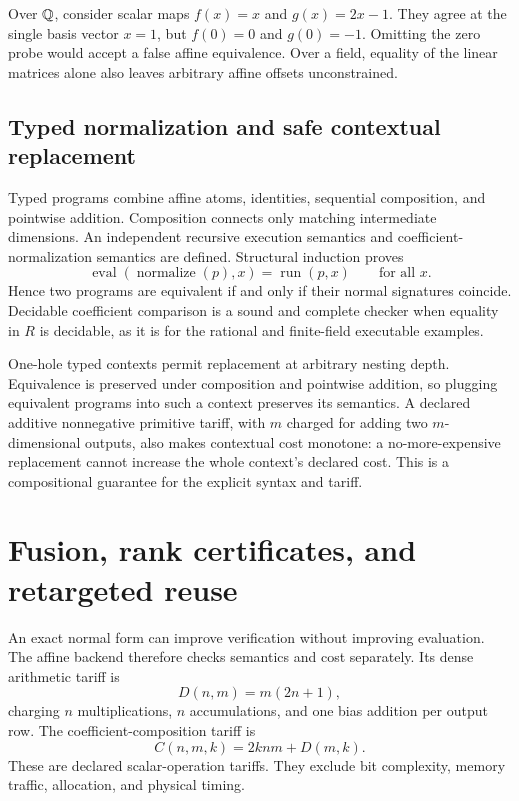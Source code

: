 \begin{example}
Over $\mathbb Q$, consider scalar maps $f(x)=x$ and $g(x)=2x-1$. They agree at the single basis vector $x=1$, but $f(0)=0$ and $g(0)=-1$. Omitting the zero probe would accept a false affine equivalence. Over a field, equality of the linear matrices alone also leaves arbitrary affine offsets unconstrained.
\end{example}

\subsection{Typed normalization and safe contextual replacement}

Typed programs combine affine atoms, identities, sequential composition, and pointwise addition. Composition connects only matching intermediate dimensions. An independent recursive execution semantics and coefficient-normalization semantics are defined. Structural induction proves
\[
 \operatorname{eval}(\operatorname{normalize}(p),x)=\operatorname{run}(p,x)
 \qquad\text{for all }x.
\]
Hence two programs are equivalent if and only if their normal signatures coincide. Decidable coefficient comparison is a sound and complete checker when equality in $R$ is decidable, as it is for the rational and finite-field executable examples.

One-hole typed contexts permit replacement at arbitrary nesting depth. Equivalence is preserved under composition and pointwise addition, so plugging equivalent programs into such a context preserves its semantics. A declared additive nonnegative primitive tariff, with $m$ charged for adding two $m$-dimensional outputs, also makes contextual cost monotone: a no-more-expensive replacement cannot increase the whole context's declared cost. This is a compositional guarantee for the explicit syntax and tariff.

\section{Fusion, rank certificates, and retargeted reuse}
\label{sec:affine-cost}

An exact normal form can improve verification without improving evaluation. The affine backend therefore checks semantics and cost separately. Its dense arithmetic tariff is
\[
 D(n,m)=m(2n+1),
\]
charging $n$ multiplications, $n$ accumulations, and one bias addition per output row. The coefficient-composition tariff is
\[
 C(n,m,k)=2knm+D(m,k).
\]
These are declared scalar-operation tariffs. They exclude bit complexity, memory traffic, allocation, and physical timing.

